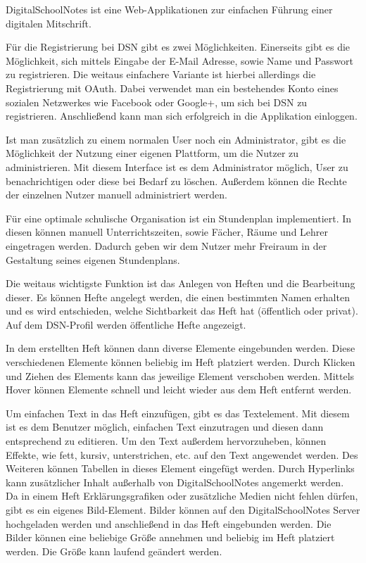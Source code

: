 DigitalSchoolNotes ist eine Web-Applikationen zur einfachen Führung einer digitalen Mitschrift.

Für die Registrierung bei DSN gibt es zwei Möglichkeiten. Einerseits gibt es die Möglichkeit, sich mittels Eingabe der E-Mail Adresse, sowie Name und Passwort zu registrieren. Die weitaus einfachere Variante ist hierbei allerdings die Registrierung mit OAuth. Dabei verwendet man ein bestehendes Konto eines sozialen Netzwerkes wie Facebook oder Google+, um sich bei DSN zu registrieren. Anschließend kann man sich erfolgreich in die Applikation einloggen.

Ist man zusätzlich zu einem normalen User noch ein Administrator, gibt es die Möglichkeit der Nutzung einer eigenen Plattform, um die Nutzer zu administrieren. Mit diesem Interface ist es dem Administrator möglich, User zu benachrichtigen oder diese bei Bedarf zu löschen. Außerdem können die Rechte der einzelnen Nutzer manuell administriert werden.

Für eine optimale schulische Organisation ist ein Stundenplan implementiert. In diesen können manuell Unterrichtszeiten, sowie Fächer, Räume und Lehrer eingetragen werden. Dadurch geben wir dem Nutzer mehr Freiraum in der Gestaltung seines eigenen Stundenplans.

Die weitaus wichtigste Funktion ist das Anlegen von Heften und die Bearbeitung dieser. Es können Hefte angelegt werden, die einen bestimmten Namen erhalten und es wird entschieden, welche Sichtbarkeit das Heft hat (öffentlich oder privat). Auf dem DSN-Profil werden öffentliche Hefte angezeigt.

In dem erstellten Heft können dann diverse Elemente eingebunden werden. Diese verschiedenen Elemente können beliebig im Heft platziert werden. Durch Klicken und Ziehen des Elements kann das jeweilige Element verschoben werden. Mittels Hover können Elemente schnell und leicht wieder aus dem Heft entfernt werden.

Um einfachen Text in das Heft einzufügen, gibt es das Textelement. Mit diesem ist es dem Benutzer möglich, einfachen Text einzutragen und diesen dann entsprechend zu editieren. Um den Text außerdem hervorzuheben, können Effekte, wie fett, kursiv, unterstrichen, etc. auf den Text angewendet werden. Des Weiteren können Tabellen in dieses Element eingefügt werden. Durch Hyperlinks kann zusätzlicher Inhalt außerhalb von DigitalSchoolNotes angemerkt werden.\\
Da in einem Heft Erklärungsgrafiken oder zusätzliche Medien nicht fehlen dürfen, gibt es ein eigenes Bild-Element. Bilder können auf den DigitalSchoolNotes Server hochgeladen werden und anschließend in das Heft eingebunden werden. Die Bilder können eine beliebige Größe annehmen und beliebig im Heft platziert werden. Die Größe kann laufend geändert werden.

